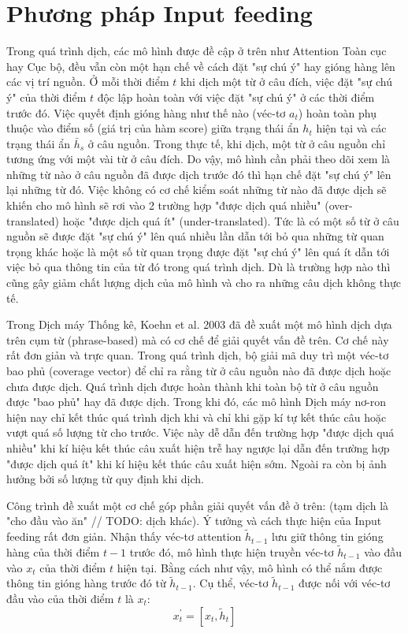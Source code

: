 \section{Phương pháp Input feeding}
Trong quá trình dịch, các mô hình được đề cập ở trên như Attention Toàn cục hay Cục bộ, đều vẫn còn một hạn chế về cách đặt "sự chú ý" hay gióng hàng lên các vị trí nguồn. Ở mỗi thời điểm $t$ khi dịch một từ ở câu đích, việc đặt "sự chú ý" của thời điểm $t$ độc lập hoàn toàn với việc đặt "sự chú ý" ở các thời điểm trước đó. Việc quyết định gióng hàng như thế nào (véc-tơ $a_t$) hoàn toàn phụ thuộc vào điểm số (giá trị của hàm score) giữa trạng thái ẩn $h_t$ hiện tại và các trạng thái ẩn $\bar{h}_s$ ở câu nguồn. Trong thực tế, khi dịch, một từ ở câu nguồn chỉ tương ứng với một vài từ ở câu đích. Do vậy, mô hình cần phải theo dõi xem là những từ nào ở câu nguồn đã được dịch trước đó thì hạn chế đặt "sự chú ý" lên lại những từ đó. Việc không có cơ chế kiểm soát những từ nào đã được dịch sẽ khiến cho mô hình sẽ rơi vào 2 trường hợp "được dịch quá nhiều" (over-translated) hoặc "được dịch quá ít" (under-translated). Tức là có một số từ ở câu nguồn sẽ được đặt "sự chú ý" lên quá nhiều lần dẫn tới bỏ qua những từ quan trọng khác hoặc là một số từ quan trọng được đặt "sự chú ý" lên quá ít dẫn tới việc bỏ qua thông tin của từ đó trong quá trình dịch. Dù là trường hợp nào thì cũng gây giảm chất lượng dịch của mô hình và cho ra những câu dịch không thực tế.

Trong Dịch máy Thống kê, Koehn et al. 2003 \cite{smtKoehn2003} đã đề xuất một mô hình dịch dựa trên cụm từ (phrase-based) mà có cơ chế để giải quyết vấn đề trên. Cơ chế này rất đơn giản và trực quan. Trong quá trình dịch, bộ giải mã duy trì một véc-tơ bao phủ (coverage vector) để chỉ ra rằng từ ở câu nguồn nào đã được dịch hoặc chưa được dịch. Quá trình dịch được hoàn thành khi toàn bộ từ ở câu nguồn được "bao phủ" hay đã được dịch. Trong khi đó, các mô hình Dịch máy nơ-ron hiện nay chỉ kết thúc quá trình dịch khi và chỉ khi gặp kí tự kết thúc câu hoặc vượt quá số lượng từ cho trước. Việc này dễ dẫn đến trường hợp "được dịch quá nhiều" khi kí hiệu kết thúc câu xuất hiện trễ hay ngược lại dẫn đến trường hợp "được dịch quá ít" khi kí hiệu kết thúc câu xuất hiện sớm. Ngoài ra còn bị ảnh hưởng bởi số lượng từ quy định khi dịch.

Công trình \cite{attentionThangLuong2015} đề xuất một cơ chế góp phần giải quyết vấn đề ở trên:  (tạm dịch là "cho đầu vào ăn" // TODO: dịch khác). Ý tưởng và cách thực hiện của Input feeding rất đơn giản. Nhận thấy véc-tơ attention $\tilde{h}_{t-1}$ lưu giữ thông tin gióng hàng của thời điểm $t-1$ trước đó, mô hình thực hiện truyền véc-tơ $\tilde{h}_{t-1}$ vào đầu vào $x_t$ của thời điểm $t$ hiện tại. Bằng cách như vậy, mô hình có thể nắm được thông tin gióng hàng trước đó từ $\tilde{h}_{t-1}$. Cụ thể, véc-tơ $\tilde{h}_{t-1}$ được nối với véc-tơ đầu vào của thời điểm $t$ là $x_t$:
\begin{equation}
x^{'}_t = [x_t, \tilde{h}_t]
\end{equation}

